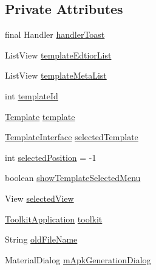 \subsection*{Private Attributes}
\begin{DoxyCompactItemize}
\item 
final Handler \hyperlink{classorg_1_1buildmlearn_1_1toolkit_1_1activity_1_1TemplateEditor_a50320fc9b82545de0cef1fd83e51f124}{handler\+Toast}
\item 
List\+View \hyperlink{classorg_1_1buildmlearn_1_1toolkit_1_1activity_1_1TemplateEditor_a09b0ee15af33371b6edc5d0d8c9e094e}{template\+Edtior\+List}
\item 
List\+View \hyperlink{classorg_1_1buildmlearn_1_1toolkit_1_1activity_1_1TemplateEditor_ae03ef38d236187ed866097da4eaaeecf}{template\+Meta\+List}
\item 
int \hyperlink{classorg_1_1buildmlearn_1_1toolkit_1_1activity_1_1TemplateEditor_a828e86661f2e2d7007430801b25346f3}{template\+Id}
\item 
\hyperlink{enumorg_1_1buildmlearn_1_1toolkit_1_1model_1_1Template}{Template} \hyperlink{classorg_1_1buildmlearn_1_1toolkit_1_1activity_1_1TemplateEditor_a2dd7c11cbe7e69502eb22f12be0bb484}{template}
\item 
\hyperlink{interfaceorg_1_1buildmlearn_1_1toolkit_1_1model_1_1TemplateInterface}{Template\+Interface} \hyperlink{classorg_1_1buildmlearn_1_1toolkit_1_1activity_1_1TemplateEditor_a71073c5ae2c78f417365ec59fd9c4e07}{selected\+Template}
\item 
int \hyperlink{classorg_1_1buildmlearn_1_1toolkit_1_1activity_1_1TemplateEditor_a3a8c09c418c4dcd89e98f460d6b65905}{selected\+Position} = -\/1
\item 
boolean \hyperlink{classorg_1_1buildmlearn_1_1toolkit_1_1activity_1_1TemplateEditor_a2af7a93dc2f0f6a3aa9ad2adc2006ce9}{show\+Template\+Selected\+Menu}
\item 
View \hyperlink{classorg_1_1buildmlearn_1_1toolkit_1_1activity_1_1TemplateEditor_ac27f27c3e26b8926f09501cd0e871614}{selected\+View}
\item 
\hyperlink{classorg_1_1buildmlearn_1_1toolkit_1_1ToolkitApplication}{Toolkit\+Application} \hyperlink{classorg_1_1buildmlearn_1_1toolkit_1_1activity_1_1TemplateEditor_af6325370557d88b7e0e8852634509a46}{toolkit}
\item 
String \hyperlink{classorg_1_1buildmlearn_1_1toolkit_1_1activity_1_1TemplateEditor_ad90816675a8760c5a922a539fe6e86a5}{old\+File\+Name}
\item 
Material\+Dialog \hyperlink{classorg_1_1buildmlearn_1_1toolkit_1_1activity_1_1TemplateEditor_afe8dcd1317d0b9075234654777563819}{m\+Apk\+Generation\+Dialog}
\end{DoxyCompactItemize}
